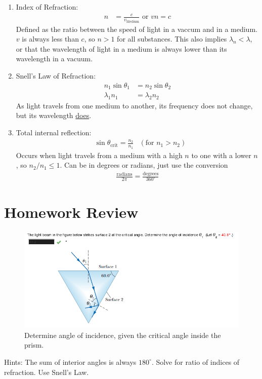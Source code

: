 \documentclass[a4paper,10pt]{report}
\begin{document}
\begin{enumerate}
  \item
    Index of Refraction:
    \begin{align*}
        n &= \frac{c}{v_{\text{Medium}}} \text{ or } vn=c
    \end{align*}
    Defined as the ratio between the speed of light in a vaccum and in a medium. $v$ is always less than $c$, so $n>1$ for all substances.
    This also implies $\lambda_n < \lambda$, or that the wavelength of light in a medium is always lower than its wavelength in a vacuum.

  \item
    Snell's Law of Refraction:
    \begin{align*}
    n_1\sin\theta_1 &= n_2\sin\theta_2 \\
    \lambda_1 n_1 &= \lambda_2 n_2
    \end{align*}
    As light travels from one medium to another, its frequency does not change, but its wavelength \underline{does}.

  \item
    Total internal reflection:
    \begin{align*}
     &\sin\theta_{\text{crit}} = \frac{n_2}{n_1} &(\text{for } n_1 > n_2)
    \end{align*}
    Occurs when light travels from a medium with a high $n$ to one with a lower $n$, so $n_2/n_1 \le 1$.
    Can be in degrees or radians, just use the conversion
    \begin{align*}
     \frac{\text{radians}}{2\pi} = \frac{\text{degrees}}{360^{\circ}}
    \end{align*}
\end{enumerate}
\section{Homework Review}

\begin{figure}[h!]
  \begin{centering}
  \begin{center}
  \includegraphics[width=\linewidth]{./prism.png}
  \caption{Determine angle of incidence, given the critical angle inside the prism.}
  \end{center}
  \par\end{centering}
  \end{figure}
  Hints: The sum of interior angles is always $180^{\circ}$. Solve for ratio of indices of refraction. Use Snell's Law.
\end{document}
